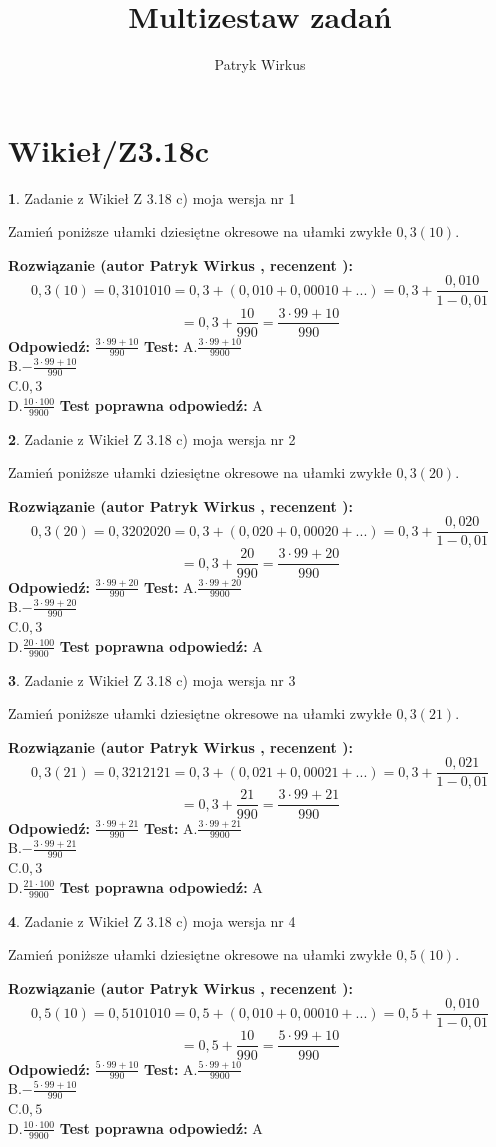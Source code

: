 \documentclass[12pt, a4paper]{article}
\title{Multizestaw zadań}
\author{Patryk Wirkus}
\date{}
\theoremstyle{definition} %
\newtheorem{zad}{}
\newcommand{\kategoria}[1]{\section{#1}}
\newcommand{\zadStart}[1]{\begin{zad}#1\newline}
\newcommand{\zadStop}{\end{zad}}
\newcommand{\rozwStart}[2]{\noindent \textbf{Rozwiązanie (autor #1 , recenzent #2): }\newline}
\newcommand{\rozwStop}{\newline}
\newcommand{\odpStart}{\noindent \textbf{Odpowiedź:}\newline}
\newcommand{\odpStop}{\newline}
\newcommand{\testStart}{\noindent \textbf{Test:}\newline}
\newcommand{\testStop}{\newline}
\newcommand{\kluczStart}{\noindent \textbf{Test poprawna odpowiedź:}\newline}
\newcommand{\kluczStop}{\newline}
\begin{document}
\maketitle

\kategoria{Wikieł/Z3.18c}


\zadStart{Zadanie z Wikieł Z 3.18 c) moja wersja nr 1}

Zamień poniższe ułamki dziesiętne okresowe na ułamki zwykłe $0,3(10)$.
\zadStop
\rozwStart{Patryk Wirkus}{}
$$0,3(10)=0,3101010=0,3+(0,010+0,00010+...)=0,3+\frac{0,010}{1-0,01}$$
$$=0,3+\frac{10}{990}=\frac{3\cdot99+10}{990}$$
\rozwStop
\odpStart
$\frac{3\cdot99+10}{990}$
\odpStop
\testStart
A.$\frac{3\cdot99+10}{9900}$\\ B.$-\frac{3\cdot99+10}{990}$\\ C.$0,3$\\ D.$\frac{10\cdot100}{9900}$
\testStop
\kluczStart
A
\kluczStop



\zadStart{Zadanie z Wikieł Z 3.18 c) moja wersja nr 2}

Zamień poniższe ułamki dziesiętne okresowe na ułamki zwykłe $0,3(20)$.
\zadStop
\rozwStart{Patryk Wirkus}{}
$$0,3(20)=0,3202020=0,3+(0,020+0,00020+...)=0,3+\frac{0,020}{1-0,01}$$
$$=0,3+\frac{20}{990}=\frac{3\cdot99+20}{990}$$
\rozwStop
\odpStart
$\frac{3\cdot99+20}{990}$
\odpStop
\testStart
A.$\frac{3\cdot99+20}{9900}$\\ B.$-\frac{3\cdot99+20}{990}$\\ C.$0,3$\\ D.$\frac{20\cdot100}{9900}$
\testStop
\kluczStart
A
\kluczStop



\zadStart{Zadanie z Wikieł Z 3.18 c) moja wersja nr 3}

Zamień poniższe ułamki dziesiętne okresowe na ułamki zwykłe $0,3(21)$.
\zadStop
\rozwStart{Patryk Wirkus}{}
$$0,3(21)=0,3212121=0,3+(0,021+0,00021+...)=0,3+\frac{0,021}{1-0,01}$$
$$=0,3+\frac{21}{990}=\frac{3\cdot99+21}{990}$$
\rozwStop
\odpStart
$\frac{3\cdot99+21}{990}$
\odpStop
\testStart
A.$\frac{3\cdot99+21}{9900}$\\ B.$-\frac{3\cdot99+21}{990}$\\ C.$0,3$\\ D.$\frac{21\cdot100}{9900}$
\testStop
\kluczStart
A
\kluczStop



\zadStart{Zadanie z Wikieł Z 3.18 c) moja wersja nr 4}

Zamień poniższe ułamki dziesiętne okresowe na ułamki zwykłe $0,5(10)$.
\zadStop
\rozwStart{Patryk Wirkus}{}
$$0,5(10)=0,5101010=0,5+(0,010+0,00010+...)=0,5+\frac{0,010}{1-0,01}$$
$$=0,5+\frac{10}{990}=\frac{5\cdot99+10}{990}$$
\rozwStop
\odpStart
$\frac{5\cdot99+10}{990}$
\odpStop
\testStart
A.$\frac{5\cdot99+10}{9900}$\\ B.$-\frac{5\cdot99+10}{990}$\\ C.$0,5$\\ D.$\frac{10\cdot100}{9900}$
\testStop
\kluczStart
A
\kluczStop
\end{document}
